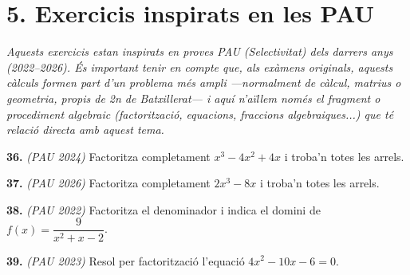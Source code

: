 \documentclass[13pt,a4paper]{extarticle}
\begin{document}
\section*{5. Exercicis inspirats en les PAU}

\par\noindent\begin{minipage}{\linewidth}
\emph{\small Aquests exercicis estan inspirats en proves PAU (Selectivitat) dels darrers anys (2022–2026). És important tenir en compte que, als exàmens originals, aquests càlculs formen part d'un problema més ampli —normalment de càlcul, matrius o geometria, propis de 2n de Batxillerat— i aquí n'aïllem només el fragment o procediment algebraic (factorització, equacions, fraccions algebraiques...) que té relació directa amb aquest tema.}\par
\end{minipage}\par\vspace{1.6mm}
\par\noindent\begin{minipage}{\linewidth}
\textbf{36.} \emph{(PAU 2024)} Factoritza completament $x^3-4x^2+4x$ i troba'n totes les arrels.\par
\end{minipage}\par\vspace{1.6mm}
\par\noindent\begin{minipage}{\linewidth}
\textbf{37.} \emph{(PAU 2026)} Factoritza completament $2x^3-8x$ i troba'n totes les arrels.\par
\end{minipage}\par\vspace{1.6mm}
\par\noindent\begin{minipage}{\linewidth}
\textbf{38.} \emph{(PAU 2022)} Factoritza el denominador i indica el domini de $f(x)=\dfrac{9}{x^2+x-2}$.\par
\end{minipage}\par\vspace{1.6mm}
\par\noindent\begin{minipage}{\linewidth}
\textbf{39.} \emph{(PAU 2023)} Resol per factorització l'equació $4x^2-10x-6=0$.\par
\end{minipage}\par\vspace{1.6mm}
\end{document}
